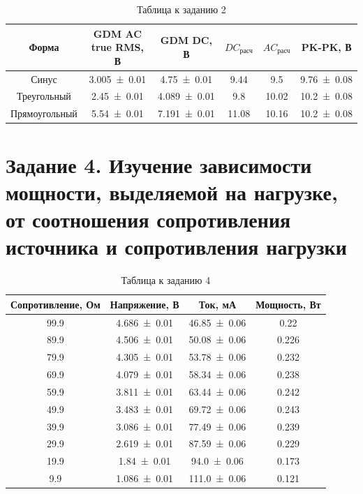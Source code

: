 \documentclass[a4paper,14pt]{article}
\begin{document}
\begin{table}[htbp]
  \centering
  \caption{Таблица к заданию 2}
  \label{tab:tab3}
  \begin{tabular}{|c|c|c|c|c|c|}
    \hline
    Форма  & GDM AC true RMS, В & GDM DC, В & $DC_{\text{расч}}$ & $AC_{\text{расч}}$ &PK-PK, В     \\ \hline
    Синус  & \num{3.005\pm 0.01}& \num{4.75\pm 0.01} & 9.44 & 9.5 & \num{9.76\pm 0.08}  \\ \hline
    Треугольный  & \num{2.45\pm 0.01} & \num{4.089\pm 0.01}& 9.8 & 10.02 & \num{10.2\pm 0.08}  \\ \hline
    Прямоугольный  & \num{5.54\pm 0.01} & \num{7.191\pm 0.01}& 11.08 & 10.16 & \num{10.2\pm 0.08}  \\ \hline
  \end{tabular}
\end{table}







\section{Задание 4. Изучение зависимости мощности, выделяемой на нагрузке, от соотношения сопротивления источника и сопротивления нагрузки}





\begin{table}[htbp]
  \centering
  \caption{Таблица к заданию 4}
  \label{tab:tab4}
  \begin{tabular}{|c|c|c|c|}
    \hline
    Сопротивление, Ом & Напряжение, В & Ток, мА & Мощность, Вт   \\ \hline
99.9 & \num{4.686 \pm 0.01} & \num{46.85 \pm 0.06} & 0.22   \\ \hline
89.9 & \num{4.506 \pm 0.01} & \num{50.08 \pm 0.06} & 0.226   \\ \hline
79.9 & \num{4.305 \pm 0.01} & \num{53.78 \pm 0.06} & 0.232   \\ \hline
69.9 & \num{4.079 \pm 0.01} & \num{58.34 \pm 0.06} & 0.238   \\ \hline
59.9 & \num{3.811 \pm 0.01} & \num{63.44 \pm 0.06} & 0.242   \\ \hline
49.9 & \num{3.483 \pm 0.01} & \num{69.72 \pm 0.06} & 0.243   \\ \hline
39.9 & \num{3.086 \pm 0.01} & \num{77.49 \pm 0.06} & 0.239   \\ \hline
29.9 & \num{2.619 \pm 0.01} & \num{87.59 \pm 0.06} & 0.229   \\ \hline
19.9 & \num{1.84 \pm 0.01} & \num{94.0 \pm 0.06} & 0.173   \\ \hline
9.9 & \num{1.086 \pm 0.01} & \num{111.0 \pm 0.06} & 0.121   \\ \hline


  \end{tabular}
\end{table}
\end{document}
